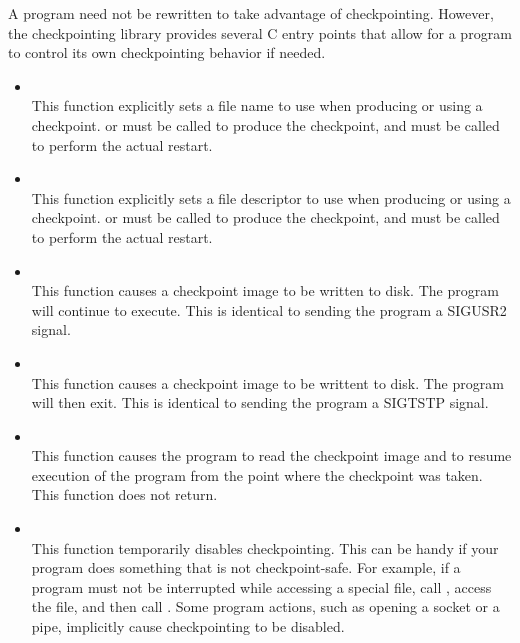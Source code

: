 A program need not be rewritten to take advantage of checkpointing.
However, the checkpointing library provides several C entry points
that allow for a program to control its own checkpointing behavior
if needed.

\begin{itemize}

\item {}\\
This function explicitly sets a file name to use when
producing or using a checkpoint.
 or
 must be called to produce the
checkpoint, and
 must be called to perform the
actual restart.

\item {}\\
This function explicitly sets a file descriptor to use when
producing or using a checkpoint.
 or
 must be called to produce the
checkpoint, and
 must be called to perform the
actual restart.

\item {}\\
This function causes a checkpoint image to be written to disk.
The program will continue to execute.  This is identical to sending
the program a SIGUSR2 signal.

\item {}\\
This function causes a checkpoint image to be writtent to disk.
The program will then exit.  This is identical to sending the program
a SIGTSTP signal.

\item {}\\
This function causes the program to read the checkpoint
image and to resume
execution of the program from the point where the checkpoint
was taken.
This function does not return.

\item {}\\
This function temporarily disables checkpointing.  This can
be handy if your program does something that is not checkpoint-safe.
For example, if a program must not be interrupted while accessing
a special file, call , access the
file, and then call .  Some program
actions, such as opening a socket or a pipe, implicitly cause
checkpointing to be disabled.


\end{itemize}
